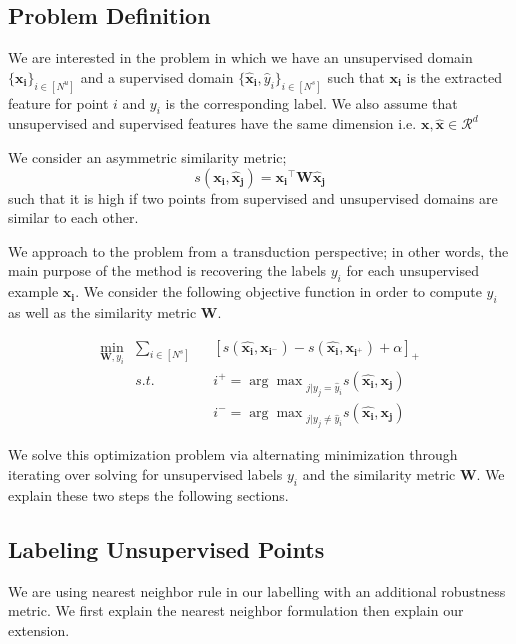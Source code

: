 \subsection{Problem Definition}
We are interested in the problem in which we have an unsupervised domain $\{\mathbf{x_i}\}_{i \in [N^u]}$ and a supervised domain $\{\mathbf{\hat{x}_i}, \hat{y}_i\}_{i \in [N^s]}$ such that $\mathbf{x_i}$ is the extracted feature for point $i$ and $y_i$ is the corresponding label. We also assume that unsupervised and supervised features have the same dimension i.e. $\mathbf{x}, \mathbf{\hat{x}} \in \mathcal{R}^d$

We consider an asymmetric similarity metric;
\begin{equation}
s(\mathbf{x_i}, \mathbf{\hat{x}_j}) = \mathbf{x_i}^\intercal \mathbf{W} \mathbf{\hat{x}_j}
\end{equation}
such that it is high if two points from supervised and unsupervised domains are similar to each other.

We approach to the problem from a transduction perspective; in other words, the main purpose of the method is recovering the labels $y_i$ for each unsupervised example $\mathbf{x_i}$. We consider the following objective function in order to compute $y_i$ as well as the similarity metric $\mathbf{W}$.

\begin{equation}
\begin{aligned}
\min_{\mathbf{W}, y_i} &\sum_{i \in [N^s]} &&[s(\mathbf{\hat{x_i}},\mathbf{x_{i^-}}) - s(\mathbf{\hat{x_i}},\mathbf{x_{i^+}}) + \alpha]_{+} \\
&s.t. \quad &&i^{+} = {\arg\max}_{j | y_j = \hat{y}_i} s(\mathbf{\hat{x_i}},\mathbf{x_{j}}) \\
&\quad &&i^{-} = {\arg\max}_{j | y_j \neq \hat{y}_i} s(\mathbf{\hat{x_i}},\mathbf{x_{j}}) 
\end{aligned}
\end{equation}

We solve this optimization problem via alternating minimization through iterating over solving for unsupervised labels $y_i$ and the similarity metric $\mathbf{W}$. We explain these two steps the following sections.

\subsection{Labeling Unsupervised Points}
We are using nearest neighbor rule in our labelling with an additional robustness metric. We first explain the nearest neighbor formulation then explain our extension. 

